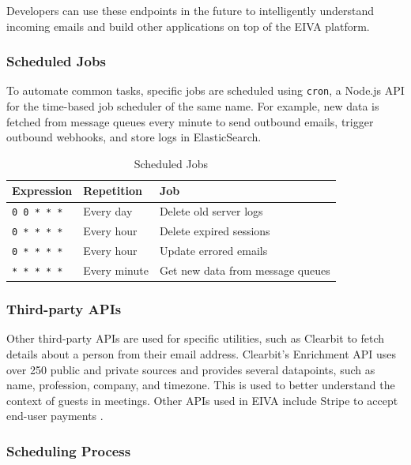\documentclass{article}
\begin{document}
Developers can use these endpoints in the future to intelligently understand incoming emails and build other applications on top of the EIVA platform.

\subsubsection{Scheduled Jobs}

To automate common tasks, specific jobs are scheduled using \texttt{cron}, a Node.js API for the time-based job scheduler of the same name. For example, new data is fetched from message queues every minute to send outbound emails, trigger outbound webhooks, and store logs in ElasticSearch.

\begin{table}[!htb]
	\begin{minipage}{1\linewidth}
		\caption{Scheduled Jobs}
		\centering
		\begin{tabular}{lll}
			\hline
			\textbf{Expression} & \textbf{Repetition} & \textbf{Job} \\
			\hline
			\texttt{0 0 * * *} & Every day & Delete old server logs \\
			\texttt{0 * * * *} & Every hour & Delete expired sessions \\
			\texttt{0 * * * *} & Every hour & Update errored emails \\
			\texttt{* * * * *} & Every minute & Get new data from message queues \\
			\hline
		\end{tabular}
	\end{minipage}%
\end{table}

\subsubsection{Third-party APIs}

Other third-party APIs are used for specific utilities, such as Clearbit to fetch details about a person from their email address. Clearbit's Enrichment API uses over 250 public and private sources and provides several datapoints, such as name, profession, company, and timezone. This is used to better understand the context of guests in meetings. Other APIs used in EIVA include Stripe to accept end-user payments \cite{wittern_web_2018}.

\subsubsection{Scheduling Process}
\end{document}
